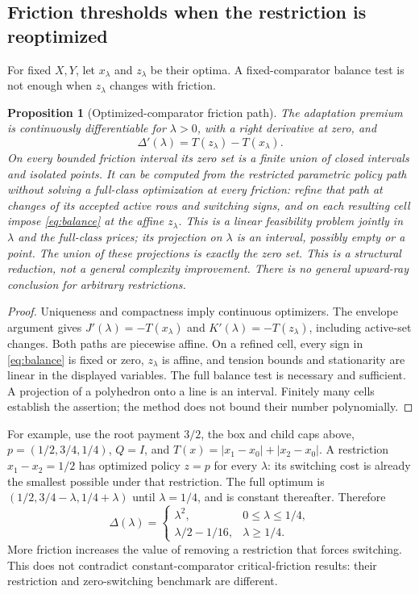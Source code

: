 \documentclass[11pt,letterpaper]{article}
\newtheorem{proposition}[theorem]{Proposition}
\theoremstyle{definition}\newtheorem{assumption}[theorem]{Assumption}
\begin{document}
\subsection{Friction thresholds when the restriction is reoptimized}
For fixed $X,Y$, let $x_\lambda$ and $z_\lambda$ be their optima. A fixed-comparator balance test is not enough when $z_\lambda$ changes with friction.
\begin{proposition}[Optimized-comparator friction path]\label{prop:friction}
The adaptation premium is continuously differentiable for $\lambda>0$, with a right derivative at zero, and
\begin{equation}\label{eq:friction}
 \Delta'(\lambda)=T(z_\lambda)-T(x_\lambda).
\end{equation}
On every bounded friction interval its zero set is a finite union of closed intervals and isolated points. It can be computed from the restricted parametric policy path without solving a full-class optimization at every friction: refine that path at changes of its accepted active rows and switching signs, and on each resulting cell impose \eqref{eq:balance} at the affine $z_\lambda$. This is a linear feasibility problem jointly in $\lambda$ and the full-class prices; its projection on $\lambda$ is an interval, possibly empty or a point. The union of these projections is exactly the zero set. This is a structural reduction, not a general complexity improvement. There is no general upward-ray conclusion for arbitrary restrictions.
\end{proposition}
\begin{proof}
Uniqueness and compactness imply continuous optimizers. The envelope argument gives $J'(\lambda)=-T(x_\lambda)$ and $K'(\lambda)=-T(z_\lambda)$, including active-set changes. Both paths are piecewise affine. On a refined cell, every sign in \eqref{eq:balance} is fixed or zero, $z_\lambda$ is affine, and tension bounds and stationarity are linear in the displayed variables. The full balance test is necessary and sufficient. A projection of a polyhedron onto a line is an interval. Finitely many cells establish the assertion; the method does not bound their number polynomially.\end{proof}

For example, use the root payment $3/2$, the box and child caps above, $p=(1/2,3/4,1/4)$, $Q=I$, and $T(x)=|x_1-x_0|+|x_2-x_0|$. A restriction $x_1-x_2=1/2$ has optimized policy $z=p$ for every $\lambda$: its switching cost is already the smallest possible under that restriction. The full optimum is $(1/2,3/4-\lambda,1/4+\lambda)$ until $\lambda=1/4$, and is constant thereafter. Therefore
\begin{equation}\label{eq:friction-example}
 \Delta(\lambda)=\begin{cases}\lambda^2,&0\leq\lambda\leq1/4,\\
 \lambda/2-1/16,&\lambda\geq1/4.
 \end{cases}
\end{equation}
More friction increases the value of removing a restriction that forces switching. This does not contradict constant-comparator critical-friction results: their restriction and zero-switching benchmark are different.
\end{document}
